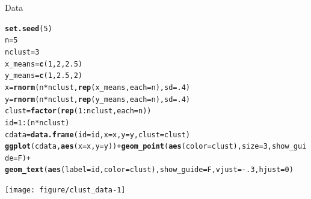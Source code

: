 \documentclass{beamer}\usepackage[]{graphicx}\usepackage[]{color}
\makeatletter
\newcommand{\hlnum}[1]{\textcolor[rgb]{0.686,0.059,0.569}{#1}}%
\newcommand{\hlopt}[1]{\textcolor[rgb]{0,0,0}{#1}}%
\newcommand{\hlstd}[1]{\textcolor[rgb]{0.345,0.345,0.345}{#1}}%
\newcommand{\hlkwb}[1]{\textcolor[rgb]{0.69,0.353,0.396}{#1}}%
\newcommand{\hlkwc}[1]{\textcolor[rgb]{0.333,0.667,0.333}{#1}}%
\newcommand{\hlkwd}[1]{\textcolor[rgb]{0.737,0.353,0.396}{\textbf{#1}}}%
\newenvironment{kframe}{%
 \def\at@end@of@kframe{}%
 \ifinner\ifhmode%
  \def\at@end@of@kframe{\end{minipage}}%
  \begin{minipage}{\columnwidth}%
 \fi\fi%
 \def\FrameCommand##1{\hskip\@totalleftmargin \hskip-\fboxsep
 \colorbox{shadecolor}{##1}\hskip-\fboxsep
     \hskip-\linewidth \hskip-\@totalleftmargin \hskip\columnwidth}%
 \MakeFramed {\advance\hsize-\width
   \@totalleftmargin\z@ \linewidth\hsize
   \@setminipage}}%
 {\par\unskip\endMakeFramed%
 \at@end@of@kframe}
\newenvironment{knitrout}{}{} %
\makeatother
\begin{document}
\begin{frame}[fragile]{Data}
\begin{knitrout}\tiny
{}\color{fgcolor}\begin{kframe}
\begin{alltt}
\hlkwd{set.seed}\hlstd{(}\hlnum{5}\hlstd{)}
\hlstd{n} \hlkwb{=} \hlnum{5}
\hlstd{nclust} \hlkwb{=} \hlnum{3}
\hlstd{x_means} \hlkwb{=} \hlkwd{c}\hlstd{(}\hlnum{1}\hlstd{,} \hlnum{2}\hlstd{,} \hlnum{2.5}\hlstd{)}
\hlstd{y_means} \hlkwb{=} \hlkwd{c}\hlstd{(}\hlnum{1}\hlstd{,} \hlnum{2.5}\hlstd{,} \hlnum{2}\hlstd{)}
\hlstd{x} \hlkwb{=} \hlkwd{rnorm}\hlstd{(n} \hlopt{*} \hlstd{nclust,} \hlkwd{rep}\hlstd{(x_means,} \hlkwc{each}\hlstd{=n),} \hlkwc{sd}\hlstd{=}\hlnum{.4}\hlstd{)}
\hlstd{y} \hlkwb{=} \hlkwd{rnorm}\hlstd{(n} \hlopt{*} \hlstd{nclust,} \hlkwd{rep}\hlstd{(y_means,} \hlkwc{each}\hlstd{=n),} \hlkwc{sd}\hlstd{=}\hlnum{.4}\hlstd{)}
\hlstd{clust} \hlkwb{=} \hlkwd{factor}\hlstd{(}\hlkwd{rep}\hlstd{(}\hlnum{1}\hlopt{:}\hlstd{nclust,} \hlkwc{each}\hlstd{=n))}
\hlstd{id} \hlkwb{=} \hlnum{1}\hlopt{:}\hlstd{(n} \hlopt{*} \hlstd{nclust)}
\hlstd{cdata} \hlkwb{=} \hlkwd{data.frame}\hlstd{(}\hlkwc{id}\hlstd{=id,} \hlkwc{x}\hlstd{=x,} \hlkwc{y}\hlstd{=y,} \hlkwc{clust}\hlstd{=clust)}
\hlkwd{ggplot}\hlstd{(cdata,} \hlkwd{aes}\hlstd{(}\hlkwc{x}\hlstd{=x,} \hlkwc{y}\hlstd{=y))} \hlopt{+} \hlkwd{geom_point}\hlstd{(}\hlkwd{aes}\hlstd{(}\hlkwc{color}\hlstd{=clust),} \hlkwc{size}\hlstd{=}\hlnum{3}\hlstd{,} \hlkwc{show_guide}\hlstd{=F)} \hlopt{+}
  \hlkwd{geom_text}\hlstd{(}\hlkwd{aes}\hlstd{(}\hlkwc{label}\hlstd{=id,} \hlkwc{color}\hlstd{=clust),} \hlkwc{show_guide}\hlstd{=F,} \hlkwc{vjust}\hlstd{=}\hlopt{-}\hlnum{.3}\hlstd{,} \hlkwc{hjust}\hlstd{=}\hlnum{0}\hlstd{)}
\end{alltt}
\end{kframe}

{\centering \texttt{[image: figure/clust\_data-1]} 

}



\end{knitrout}
\end{frame}
\end{document}
